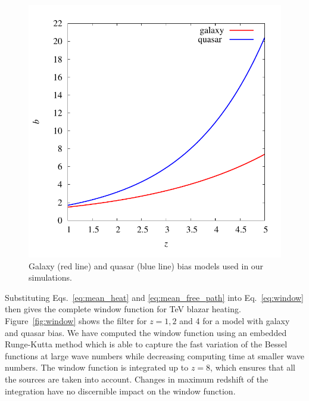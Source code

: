 \documentclass[numberedappendix]{emulateapj}
\begin{document}
\begin{figure}[h]
\centering
\includegraphics[width = .4\textwidth ]{bias}
\caption{Galaxy (red line) and quasar (blue line) bias models used in our simulations.}
\label{fig:bias}
\end{figure}

Substituting Eqs.~\eqref{eq:mean_heat} and \eqref{eq:mean_free_path} into Eq.~\eqref{eq:window} then gives the complete window function for TeV blazar heating. Figure~\ref{fig:window} shows the filter for $z=1,2$ and 4 for a model with galaxy and quasar bias. We have computed the window function using an embedded Runge-Kutta method which is able to capture the fast variation of the Bessel functions at large wave numbers while decreasing computing time at smaller wave numbers. The window function is integrated up to $z=8$, which ensures that all the sources are taken into account. Changes in maximum redshift of the integration have no discernible impact on the window function.
\end{document}
